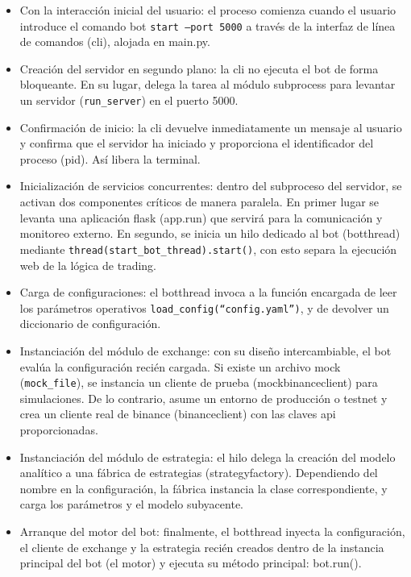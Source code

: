 \begin{itemize}
\item Con la interacción inicial del usuario: el proceso comienza cuando el usuario introduce el comando bot \texttt{start --port 5000} a través de la interfaz de línea de comandos (cli), alojada en main.py.\\

\item  Creación del servidor en segundo plano: la cli no ejecuta el bot de forma bloqueante. En su lugar, delega la tarea al módulo subprocess para levantar un servidor (\texttt{run\_server}) en el puerto 5000.\\

\item  Confirmación de inicio: la cli devuelve inmediatamente un mensaje al usuario y confirma que el servidor ha iniciado y proporciona el identificador del proceso (pid). Así libera la terminal.\\

\item  Inicialización de servicios concurrentes: dentro del subproceso del servidor, se activan dos componentes críticos de manera paralela. En primer lugar se levanta una aplicación flask (app.run) que servirá para la comunicación y monitoreo externo. En segundo, se inicia un hilo dedicado al bot (botthread) mediante \texttt{thread(start\_bot\_thread).start()}, con esto separa la ejecución web de la lógica de trading.\\

\item Carga de configuraciones: el botthread invoca a la función encargada de leer los parámetros operativos \texttt{load\_config(``config.yaml'')},  y de devolver un diccionario de configuración.\\

\item  Instanciación del módulo de exchange: con su diseño intercambiable, el bot evalúa la configuración recién cargada. Si existe un archivo mock (\texttt{mock\_file}), se instancia un cliente de prueba (mockbinanceclient) para simulaciones. De lo contrario, asume un entorno de producción o testnet y crea un cliente real de binance (binanceclient) con las claves api proporcionadas.\\

\item  Instanciación del módulo de estrategia: el hilo delega la creación del modelo analítico a una fábrica de estrategias (strategyfactory). Dependiendo del nombre en la configuración, la fábrica instancia la clase correspondiente, y carga los parámetros y el modelo subyacente.\\

\item  Arranque del motor del bot: finalmente, el botthread inyecta la configuración, el cliente de exchange y la estrategia recién creados dentro de la instancia principal del bot (el motor) y ejecuta su método principal: bot.run().\\

 \end{itemize}


